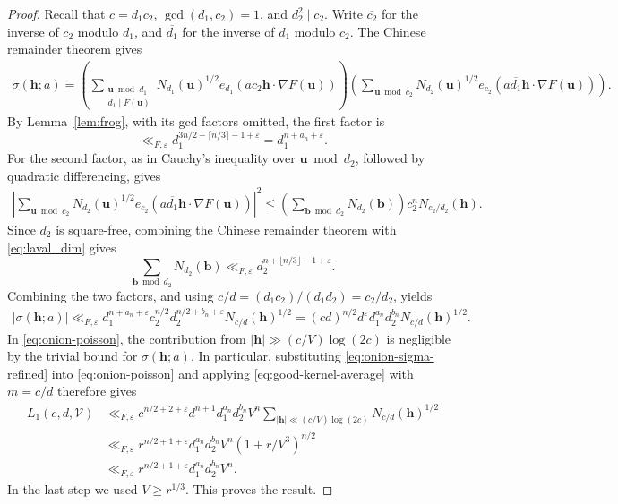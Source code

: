 \documentclass[a4paper,11pt, twoside,reqno]{amsart}
\theoremstyle{plain}
\theoremstyle{definition}
\theoremstyle{remark}
\newcommand{\bfh}{\bm{h}}
\newcommand{\bfb}{\bm{b}}
\newcommand{\bu}{\bm{u}}
\renewcommand{\bar}{\overline}
\newcommand{\ve}{\varepsilon}
\renewcommand{\le}{\leqslant}
\renewcommand{\ge}{\geqslant}
\numberwithin{equation}{section}
\begin{document}
\begin{proof}
Recall that $c=d_1c_2$, $\gcd(d_1,c_2)=1$, and $d_2^2\mid c_2$.
Write $\bar{c_2}$ for the inverse of $c_2$ modulo $d_1$,
and $\bar{d_1}$ for the inverse of $d_1$ modulo $c_2$.
The Chinese remainder theorem gives
\begin{align*}
 \sigma(\bfh;a)
 =\left(
 \sum_{\substack{\bu\bmod d_1\\d_1\mid F(\bu)}}
 N_{d_1}(\bu)^{1/2}
 e_{d_1}(a\bar{c_2}\bfh\cdot\nabla F(\bu))
 \right)
\left(
 \sum_{\bu\bmod c_2}N_{d_2}(\bu)^{1/2}
 e_{c_2}(a\bar{d_1}\bfh\cdot\nabla F(\bu))
 \right).
\end{align*}
By Lemma~\ref{lem:frog}, with its gcd factors omitted, the first
factor is
\[
 \ll_{F,\ve}d_1^{3n/2-\lceil n/3\rceil-1+\ve}
 =d_1^{n+a_n+\ve}.
\]
For the second factor, as in \cite[Eq.~(5.14)]{41} Cauchy's inequality over $\bu\bmod d_2$,
followed by quadratic differencing, gives
\begin{align*}
\left|
 \sum_{\bu\bmod c_2}N_{d_2}(\bu)^{1/2}
 e_{c_2}(a\bar{d_1}\bfh\cdot\nabla F(\bu))
 \right|^2\le
 \left(\sum_{\bfb\bmod d_2}N_{d_2}(\bfb)\right)
 c_2^nN_{c_2/d_2}(\bfh).
\end{align*}
Since $d_2$ is square-free, combining the Chinese remainder theorem with \eqref{eq:laval_dim} gives
\[
 \sum_{\bfb\bmod d_2}N_{d_2}(\bfb)
 \ll_{F,\ve}d_2^{n+\lfloor n/3\rfloor-1+\ve}.
\]
Combining the two factors, and using $c/d=(d_1c_2)/(d_1d_2)=c_2/d_2$, yields
\begin{equation}\label{eq:onion-sigma-refined}
\begin{aligned}
 |\sigma(\bfh;a)|
 \ll_{F,\ve}
 d_1^{n+a_n+\ve}c_2^{n/2}
 d_2^{n/2+b_n+\ve}N_{c/d}(\bfh)^{1/2}
 =
 (cd)^{n/2}d^\ve d_1^{a_n}d_2^{b_n}
 N_{c/d}(\bfh)^{1/2}.
\end{aligned}
\end{equation}
In \eqref{eq:onion-poisson}, the contribution from
$|\bfh|\gg (c/V)\log(2c)$ is negligible by the trivial
bound for $\sigma(\bfh;a)$.
In particular, substituting \eqref{eq:onion-sigma-refined} into \eqref{eq:onion-poisson} and applying \eqref{eq:good-kernel-average} with $m=c/d$ therefore gives
\begin{align*}
 L_1(c,d,\mathcal V)
 &\ll_{F,\ve}
 c^{n/2+2+\ve}d^{n+1}d_1^{a_n}d_2^{b_n}V^n
 \sum_{|\bfh|\ll(c/V)\log(2c)}N_{c/d}(\bfh)^{1/2}\\
 &\ll_{F,\ve}
 r^{n/2+1+\ve}d_1^{a_n}d_2^{b_n}
 V^n(1+r/V^3)^{n/2}\\
 &\ll_{F,\ve}
 r^{n/2+1+\ve}d_1^{a_n}d_2^{b_n}V^n.
\end{align*}
In the last step we used $V\ge r^{1/3}$.
This proves the result.
\end{proof}
\end{document}
